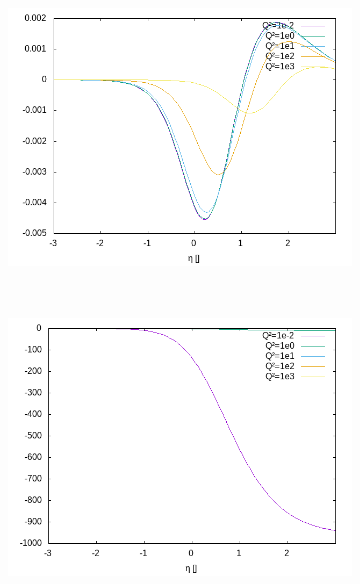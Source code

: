\begin{figure}[ht!]
\begin{subfigure}[t]{.3\textwidth}
	\includegraphics[width=\textwidth]{../../img2/partonic/cqBarF1_VV_x2g1}
\end{subfigure}\\%
\begin{subfigure}[t]{.3\textwidth}
	\includegraphics[width=\textwidth]{../../img2/partonic/cqBarF1_AA_F2}
\end{subfigure}%
\begin{subfigure}[t]{.3\textwidth}

\end{subfigure}
\end{figure}
